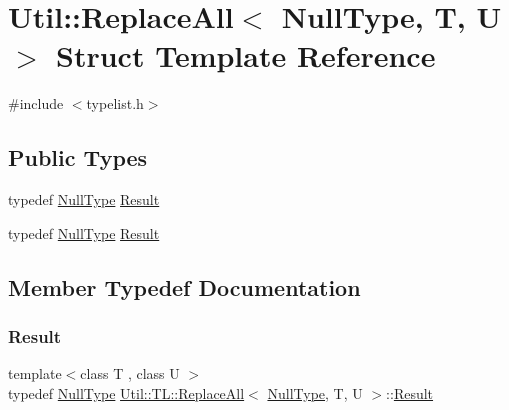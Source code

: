 \hypertarget{structUtil_1_1TL_1_1ReplaceAll_3_01NullType_00_01T_00_01U_01_4}{}\section{Util\+:\+:Replace\+All$<$ Null\+Type, T, U $>$ Struct Template Reference}
\label{structUtil_1_1TL_1_1ReplaceAll_3_01NullType_00_01T_00_01U_01_4}


{\ttfamily \#include $<$typelist.\+h$>$}

\subsection*{Public Types}
\begin{DoxyCompactItemize}
\item 
typedef \mbox{\hyperlink{classUtil_1_1NullType}{Null\+Type}} \mbox{\hyperlink{structUtil_1_1TL_1_1ReplaceAll_3_01NullType_00_01T_00_01U_01_4_aa55fd49700fa3811cad906ae93201843}{Result}}
\item 
typedef \mbox{\hyperlink{classUtil_1_1NullType}{Null\+Type}} \mbox{\hyperlink{structUtil_1_1TL_1_1ReplaceAll_3_01NullType_00_01T_00_01U_01_4_aa55fd49700fa3811cad906ae93201843}{Result}}
\end{DoxyCompactItemize}


\subsection{Member Typedef Documentation}
\mbox{\label{structUtil_1_1TL_1_1ReplaceAll_3_01NullType_00_01T_00_01U_01_4_aa55fd49700fa3811cad906ae93201843}} 
\subsubsection{\texorpdfstring{Result}{Result}\hspace{0.1cm}{\footnotesize\ttfamily [1/2]}}
{\footnotesize\ttfamily template$<$class T , class U $>$ \\
typedef \mbox{\hyperlink{classUtil_1_1NullType}{Null\+Type}} \mbox{\hyperlink{structUtil_1_1TL_1_1ReplaceAll}{Util\+::\+T\+L\+::\+Replace\+All}}$<$ \mbox{\hyperlink{classUtil_1_1NullType}{Null\+Type}}, T, U $>$\+::\mbox{\hyperlink{structUtil_1_1TL_1_1ReplaceAll_3_01NullType_00_01T_00_01U_01_4_aa55fd49700fa3811cad906ae93201843}{Result}}}

